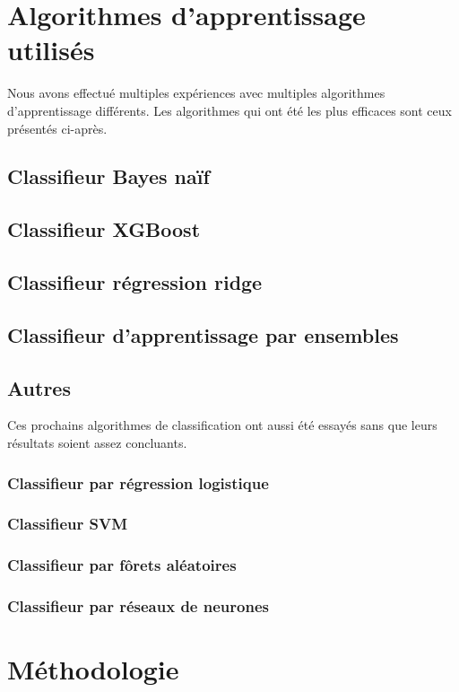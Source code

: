 \documentclass{article}
\begin{document}
\section{Algorithmes d'apprentissage utilisés}
Nous avons effectué multiples expériences avec multiples algorithmes d'apprentissage différents. Les algorithmes qui ont été les plus efficaces sont ceux présentés ci-après.
\subsection{Classifieur Bayes naïf}

\subsection{Classifieur XGBoost}

\subsection{Classifieur régression ridge}

\subsection{Classifieur d'apprentissage par ensembles}

\subsection{Autres}
Ces prochains algorithmes de classification ont aussi été essayés sans que leurs résultats soient assez concluants.
\subsubsection{Classifieur par régression logistique}
\subsubsection{Classifieur SVM}
\subsubsection{Classifieur par fôrets aléatoires}
\subsubsection{Classifieur par réseaux de neurones}

\section{Méthodologie}
\end{document}
